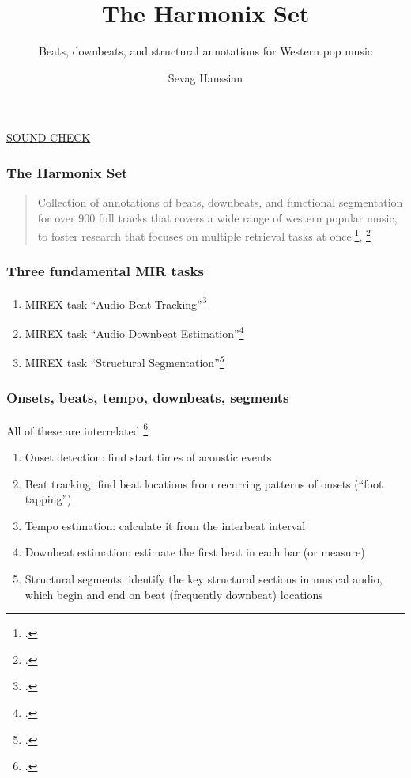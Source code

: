 \documentclass{beamer}
\title{The Harmonix Set}
\subtitle{Beats, downbeats, and structural annotations for Western pop music}
\author{Sevag Hanssian}
\institute{MUMT 621, Winter 2021}
\begin{document}
\begin{frame}
\maketitle
\href{run:./gangnam.wav}{SOUND CHECK}
\end{frame}

\begin{frame}
	\frametitle{The Harmonix Set}
	\begin{quote}
	Collection of annotations of beats, downbeats, and functional segmentation for over 900 full tracks that covers a wide range of western popular music, to foster research that focuses on multiple retrieval tasks at once.\footcite{harmonixpaper}, \footcite{harmonixrepo}
	\end{quote}
	
\end{frame}


\begin{frame}
	\frametitle{Three fundamental MIR tasks}
	\begin{enumerate}
		\item
			MIREX task ``Audio Beat Tracking''\footcite{mirexabt}
		\item
			MIREX task ``Audio Downbeat Estimation''\footcite{mirexade}
		\item
			MIREX task ``Structural Segmentation''\footcite{mirexss}
	\end{enumerate}
\end{frame}

\begin{frame}
	\frametitle{Onsets, beats, tempo, downbeats, segments}
	All of these are interrelated \footcite{beattempo}\\
	\begin{enumerate}
		\item
			Onset detection: find start times of acoustic events
		\item
			Beat tracking: find beat locations from recurring patterns of onsets (``foot tapping'')
		\item
			Tempo estimation: calculate it from the interbeat interval
		\item
			Downbeat estimation: estimate the first beat in each bar (or measure)
		\item
			Structural segments: identify the key structural sections in musical audio, which begin and end on beat (frequently downbeat) locations
	\end{enumerate}
\end{frame}
\end{document}
